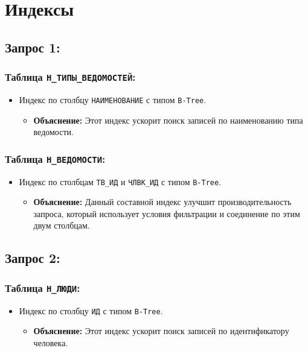 \documentclass[14pt]{extreport}
\begin{document}
\chapter{Индексы}

        \section*{Запрос 1:}

            \subsection*{Таблица \texttt{Н\_ТИПЫ\_ВЕДОМОСТЕЙ}:}
                \begin{itemize}
                    \item Индекс по столбцу \texttt{НАИМЕНОВАНИЕ} с типом \texttt{B-Tree}.
                    \begin{itemize}
                        \item \textbf{Объяснение:} Этот индекс ускорит поиск записей по наименованию типа ведомости.
                    \end{itemize}
                \end{itemize}

            \subsection*{Таблица \texttt{Н\_ВЕДОМОСТИ}:}
                \begin{itemize}
                    \item Индекс по столбцам \texttt{ТВ\_ИД} и \texttt{ЧЛВК\_ИД} с типом \texttt{B-Tree}.
                    \begin{itemize}
                        \item \textbf{Объяснение:} Данный составной индекс улучшит производительность запроса, который использует условия фильтрации и соединение по этим двум столбцам.
                    \end{itemize}
                \end{itemize}

        \section*{Запрос 2:}

            \subsection*{Таблица \texttt{Н\_ЛЮДИ}:}
                \begin{itemize}
                    \item Индекс по столбцу \texttt{ИД} с типом \texttt{B-Tree}.
                    \begin{itemize}
                        \item \textbf{Объяснение:} Этот индекс ускорит поиск записей по идентификатору человека.
                    \end{itemize}
                \end{itemize}
\end{document}
